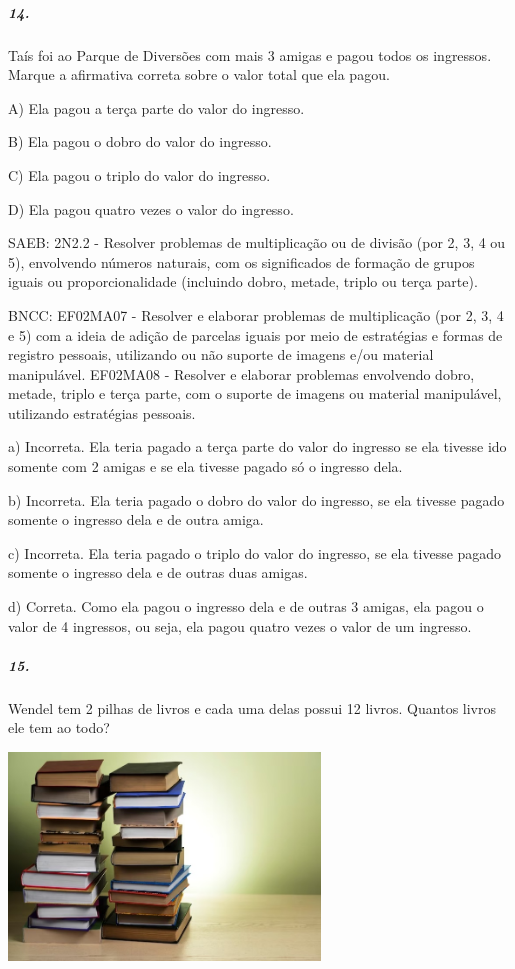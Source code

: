 \subparagraph{14. }\label{section-113}

Taís foi ao Parque de Diversões com mais 3 amigas e pagou todos os
ingressos. Marque a afirmativa correta sobre o valor total que ela
pagou.

A) Ela pagou a terça parte do valor do ingresso.

B) Ela pagou o dobro do valor do ingresso.

C) Ela pagou o triplo do valor do ingresso.

D) Ela pagou quatro vezes o valor do ingresso.

SAEB: 2N2.2 - Resolver problemas de multiplicação ou de divisão (por 2,
3, 4 ou 5), envolvendo números naturais, com os significados de formação
de grupos iguais ou proporcionalidade (incluindo dobro, metade, triplo
ou terça parte).

BNCC: EF02MA07 - Resolver e elaborar problemas de multiplicação (por 2,
3, 4 e 5) com a ideia de adição de parcelas iguais por meio de
estratégias e formas de registro pessoais, utilizando ou não suporte de
imagens e/ou material manipulável. EF02MA08 - Resolver e elaborar
problemas envolvendo dobro, metade, triplo e terça parte, com o suporte
de imagens ou material manipulável, utilizando estratégias pessoais.

a) Incorreta. Ela teria pagado a terça parte do valor do ingresso se ela
tivesse ido somente com 2 amigas e se ela tivesse pagado só o ingresso
dela.

b) Incorreta. Ela teria pagado o dobro do valor do ingresso, se ela
tivesse pagado somente o ingresso dela e de outra amiga.

c) Incorreta. Ela teria pagado o triplo do valor do ingresso, se ela
tivesse pagado somente o ingresso dela e de outras duas amigas.

d) Correta. Como ela pagou o ingresso dela e de outras 3 amigas, ela
pagou o valor de 4 ingressos, ou seja, ela pagou quatro vezes o valor de
um ingresso.

\subparagraph{15. }\label{section-114}

Wendel tem 2 pilhas de livros e cada uma delas possui 12 livros. Quantos
livros ele tem ao todo?

\includegraphics[width=3.26042in,height=2.17361in]{media/image124.jpeg}

